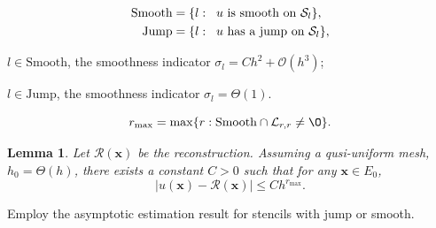 \documentclass[usenames,dvipsnames,letterpaper,landscape,final]{slides}
\newtheorem*{lem*}{Lemma}
\theoremstyle{definition}
\begin{document}
\begin{myslide}
\begin{equation*}\label{eq:groupstencil}
\begin{aligned}
		  \text{Smooth} &= \{l:\hspace{0.2cm} \text{$u$ is smooth on $\mathcal{S}_l$}\},\\
		  \text{Jump}   &= \{l:\hspace{0.2cm} \text{$u$ has a jump on $\mathcal{S}_l$}\},
\end{aligned}
\end{equation*}

\vspace{0.5cm}

\begin{blist}
\item $l \in \text{Smooth}$, the smoothness indicator $\sigma_l = Ch^2 + \mathcal{O}(h^3)$; 
\item $l \in \text{Jump}$, the smoothness indicator $\sigma_l = \Theta(1)$.
\end{blist}

 \begin{equation*}\label{eq:maxr}
r_{\max} = \max\{r: \text{Smooth} \cap \mathcal{L}_{r,r}  \neq \O \}.
\end{equation*}

\begin{lem*}
		  Let $\mathcal{R}(\mathbf{x})$ be the reconstruction. Assuming a 
		  qusi-uniform mesh, $h_0 = \Theta(h)$, there exists a constant $C>0$
		  such that for any $\mathbf{x} \in E_0$, 
		  \begin{equation*}\label{eq:errorestimate}
					 \lvert u(\mathbf{x}) - \mathcal{R}(\mathbf{x}) \rvert \leq C h^{r_{\max}}.
		  \end{equation*}
\end{lem*}

 Employ the asymptotic estimation result for stencils with jump or smooth.

\end{myslide}
\end{document}
